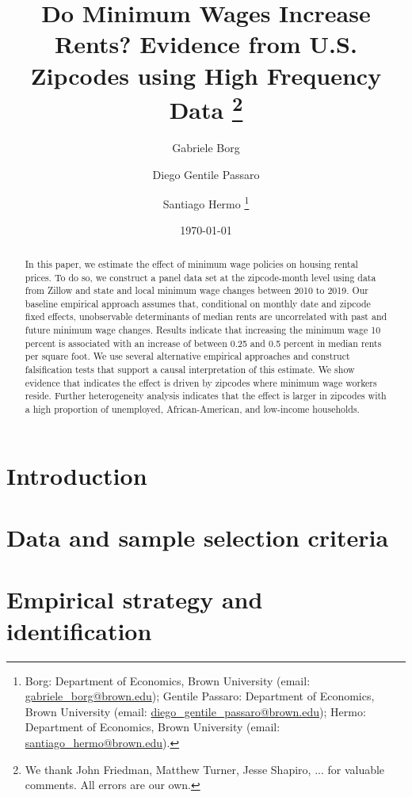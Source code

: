 \documentclass{article}
\title{Do Minimum Wages Increase Rents? 
	   Evidence from U.S. Zipcodes using High Frequency Data 
	   \thanks{We thank John Friedman, Matthew Turner, Jesse Shapiro, ... 
	   		   for valuable comments. All errors are our own.}}
\author{Gabriele Borg \and Diego Gentile Passaro \and Santiago Hermo
		\footnote{Borg: Department of Economics, Brown University (email: 
		\url{gabriele_borg@brown.edu}); 
		Gentile Passaro: Department of Economics, Brown University (email: 
		\url{diego_gentile_passaro@brown.edu}); 
		Hermo: Department of Economics, Brown University (email: 
		\url{santiago_hermo@brown.edu}).}
		}
\date{\today}
\begin{document}
\maketitle

\begin{abstract}
    \noindent 
    In this paper, we estimate the effect of minimum wage policies on housing rental 
    prices. To do so, we construct a panel data set at the zipcode-month level using 
    data from Zillow and state and local minimum wage changes between 2010 to 2019. 
    Our baseline empirical approach assumes that, conditional on monthly date and zipcode 
    fixed effects, unobservable determinants of median rents are uncorrelated with past 
    and future minimum wage changes. Results indicate that increasing the minimum wage 10 
    percent is associated with an increase of between 0.25 and 0.5 percent in median rents 
    per square foot. We use several alternative empirical approaches and construct 
    falsification tests that support a causal interpretation of this estimate. We show 
    evidence that indicates the effect is driven by zipcodes where minimum wage workers 
    reside. Further heterogeneity analysis indicates that the effect is larger in zipcodes 
    with a high proportion of unemployed, African-American, and low-income households.
\end{abstract}

\vspace{5mm}

\maketitle
\onehalfspacing

\clearpage

\section{Introduction}\label{sec:intro}
    

\section{Data and sample selection criteria}\label{sec:data}
	

\section{Empirical strategy and identification}\label{sec:empirical_strategy}
    
\end{document}
